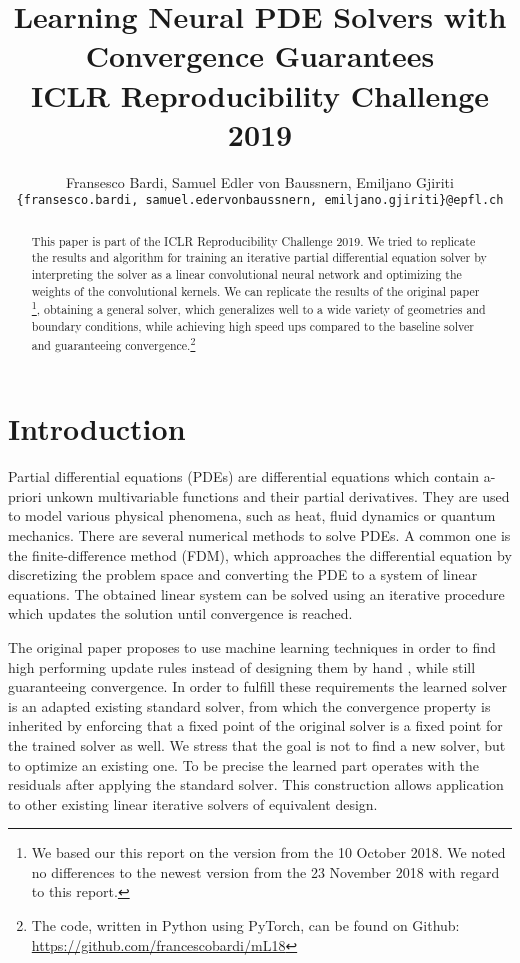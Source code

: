 \documentclass{article} %
\title{Learning Neural PDE Solvers with Convergence Guarantees \\ICLR Reproducibility Challenge 2019 }
\author{Fransesco Bardi, Samuel Edler von Baussnern, Emiljano Gjiriti \\
\texttt{\{fransesco.bardi, samuel.edervonbaussnern, emiljano.gjiriti\}@epfl.ch}}
\begin{document}
\maketitle

\begin{abstract}
This paper is part of the ICLR Reproducibility Challenge 2019. We tried to replicate the results and algorithm for training an iterative partial differential equation solver by interpreting the solver as a linear convolutional neural network and optimizing the weights of the convolutional kernels. We can replicate the results of the original paper \cite{original_paper}\footnote{We based our this report on the version from the 10 October 2018. We noted no differences to the newest version from the 23 November 2018 with regard to this report.}, obtaining a general solver, which generalizes well to a wide variety of geometries and boundary conditions, while achieving high speed ups compared to the baseline solver and guaranteeing convergence.\footnote{The code, written in Python using PyTorch, can be found on Github: \url{https://github.com/francescobardi/mL18}}
\end{abstract}

\section{Introduction}

Partial differential equations (PDEs) are differential equations which contain a-priori unkown multivariable functions and their partial derivatives. They are used to model various physical phenomena, such as heat, fluid dynamics or quantum mechanics. There are several numerical methods to solve PDEs. A common one is the finite-difference method (FDM), which approaches the differential equation by discretizing the problem space and converting the PDE to a system of linear equations. The obtained linear system can be solved using an iterative procedure which updates the solution until convergence is reached.

The original paper proposes to use machine learning techniques in order to find high performing update rules instead of designing them by hand \cite{original_paper}, while still guaranteeing convergence.  
In order to fulfill these requirements the learned solver is an adapted existing standard solver, from which the convergence property is inherited by enforcing that a fixed point of the original solver is a fixed point for the trained solver as well. We stress that the goal is not to find a new solver, but to optimize an existing one. To be precise the learned part operates with the residuals after applying the standard solver. This construction allows application to other existing linear iterative solvers of equivalent design.
\end{document}
